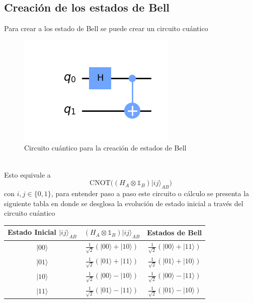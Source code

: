 \documentclass[a4paper]{article}
\begin{document}
\subsection{Creación de los estados de Bell}
Para crear a los estado de Bell se puede crear un circuito cuántico
\begin{figure}[h]
\begin{center}
\includegraphics[scale=0.69]{./Bell_states_creation.png} 
\end{center} 
\caption{Circuito cuántico para la creación de estados de Bell}
\label{fig::NOT_gate}
\end{figure}\\
Esto equivale a 
\begin{equation}
\text{CNOT}\bigg((H_A\otimes\mathbb{1}_B)|ij\rangle_{AB} \bigg)
\end{equation}
con $i,j\in\{0,1\}$, para entender paso a paso este circuito o cálculo se presenta la siguiente tabla en donde se desglosa la evolución de estado inicial a través del circuito cuántico
\begin{center}
\begin{tabular}{ |c|c|c| } 
 \hline
 Estado Inicial $|ij\rangle_{AB} $ & $(H_A\otimes\mathbb{1}_B)|ij\rangle_{AB}$ & Estados de Bell \\ \hline
 $|00\rangle$  & $\frac{1}{\sqrt{2}}(|00\rangle+|10\rangle)$   &  $\frac{1}{\sqrt{2}}(|00\rangle+|11\rangle)$\\\hline
 $|01\rangle$  & $\frac{1}{\sqrt{2}}(|01\rangle+|11\rangle)$   &  $\frac{1}{\sqrt{2}}(|01\rangle+|10\rangle)$\\\hline
 $|10\rangle$  & $\frac{1}{\sqrt{2}}(|00\rangle-|10\rangle)$   &  $\frac{1}{\sqrt{2}}(|00\rangle-|11\rangle)$\\\hline
 $|11\rangle$  & $\frac{1}{\sqrt{2}}(|01\rangle-|11\rangle)$   &  $\frac{1}{\sqrt{2}}(|01\rangle-|10\rangle)$\\
 \hline
\end{tabular}
\end{center}
\end{document}
